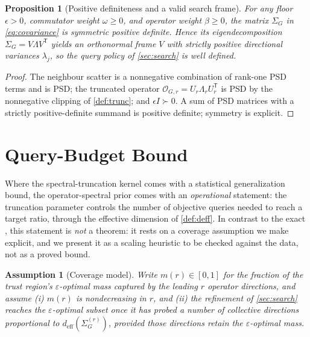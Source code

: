 \documentclass[aps,prresearch,reprint,amsmath,amssymb,floatfix,nofootinbib,superscriptaddress,longbibliography]{revtex4-2}
\newtheorem{proposition}{Proposition}
\newtheorem{assumption}{Assumption}
\theoremstyle{remark}
\newcommand{\calO}{\mathcal{O}}
\begin{document}
\begin{proposition}[Positive definiteness and a valid search frame]
\label{prop:pd}
For any floor \(\epsilon>0\), commutator weight \(\omega\ge0\), and operator
weight \(\beta\ge0\), the matrix \(\Sigma_G\) in \cref{eq:covariance} is
symmetric positive definite.  Hence its eigendecomposition
\(\Sigma_G=V\Lambda V^{\mathsf T}\) yields an orthonormal frame \(V\) with
strictly positive directional variances \(\lambda_j\), so the query policy of
\cref{sec:search} is well defined.
\end{proposition}
\begin{proof}
The neighbour scatter is a nonnegative combination of rank-one PSD terms and is
PSD; the truncated operator \(\calO_{G,r}=U_r\Lambda_rU_r^{\mathsf T}\) is PSD by
the nonnegative clipping of \cref{def:trunc}; and \(\epsilon I\succ0\).  A sum of
PSD matrices with a strictly positive-definite summand is positive definite;
symmetry is explicit.
\end{proof}

\section{Query-Budget Bound}
\label{sec:bound}

Where the spectral-truncation kernel comes with a statistical generalization
bound, the operator-spectral prior comes with an \emph{operational} statement: the
truncation parameter controls the number of objective queries needed to reach a
target ratio, through the effective dimension of \cref{def:deff}.  In contrast to
the exact , this statement is \emph{not} a theorem:
it rests on a coverage assumption we make explicit, and we present it as a scaling
heuristic to be checked against the data, not as a proved bound.

\begin{assumption}[Coverage model]
\label{ass:coverage}
Write \(m(r)\in[0,1]\) for the fraction of the trust region's
\(\varepsilon\)-optimal mass captured by the leading \(r\) operator directions,
and assume (i) \(m(r)\) is nondecreasing in \(r\), and (ii) the refinement of
\cref{sec:search} reaches the \(\varepsilon\)-optimal subset once it has probed a
number of collective directions proportional to
\(d_{\mathrm{eff}}(\Sigma_G^{(r)})\), provided those directions retain the
\(\varepsilon\)-optimal mass.
\end{assumption}
\end{document}
